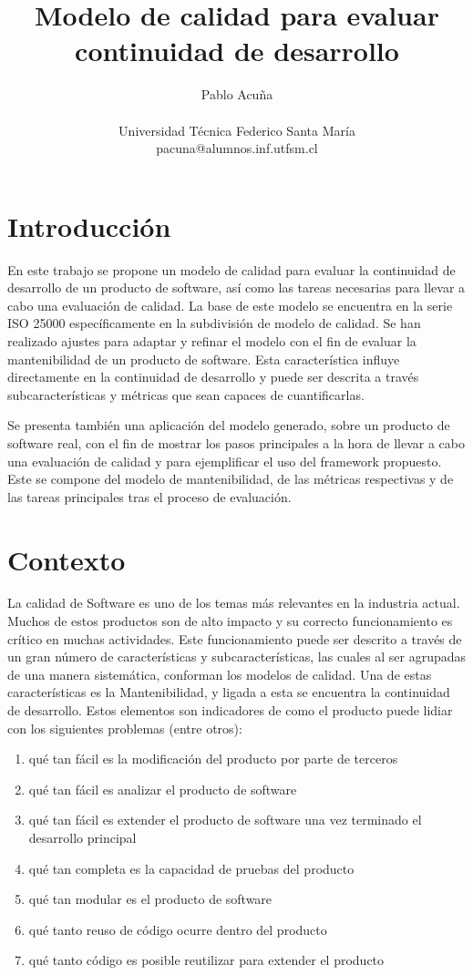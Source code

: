 \documentclass[letterpaper]{article}
\title{Modelo de calidad para evaluar continuidad de desarrollo}
\author{Pablo Acuña\\
\mbox{}\\
Universidad Técnica Federico Santa María \\
pacuna@alumnos.inf.utfsm.cl}
\begin{document}
\maketitle

\section{Introducción}

En este trabajo se propone un modelo de calidad para evaluar la continuidad
de desarrollo de un producto de software, así como las tareas necesarias
para llevar a cabo una evaluación de calidad.
La base de este modelo se encuentra en la serie ISO 25000
específicamente en la subdivisión de modelo de calidad.
Se han realizado ajustes para adaptar y refinar el modelo con el fin de evaluar la mantenibilidad de un producto de software.
Esta característica influye directamente en la continuidad de desarrollo y puede
ser descrita a través subcaracterísticas y métricas que sean capaces de cuantificarlas.

Se presenta también una aplicación del modelo generado, sobre un producto de software
real, con el fin de mostrar los pasos principales a la hora de llevar a cabo
una evaluación de calidad y para ejemplificar el uso del framework propuesto. Este se compone
del modelo de mantenibilidad, de las métricas respectivas y de las tareas principales tras el proceso de evaluación.

\section{Contexto}
La calidad de Software es uno de los temas más relevantes en la industria actual. Muchos de estos productos
son de alto impacto y su correcto funcionamiento es crítico en muchas actividades. Este funcionamiento
puede ser descrito a través de un gran número de características y subcaracterísticas, las cuales al ser agrupadas
de una manera sistemática, conforman los modelos de calidad. Una de estas características es la Mantenibilidad, y ligada
a esta se encuentra la continuidad de desarrollo. Estos elementos son indicadores de como el producto puede lidiar
con los siguientes problemas (entre otros):
\begin{enumerate}
	\item qué tan fácil es la modificación del producto por parte de terceros
	\item qué tan fácil es analizar el producto de software
	\item qué tan fácil es extender el producto de software una vez terminado el desarrollo principal
	\item qué tan completa es la capacidad de pruebas del producto
	\item qué tan modular es el producto de software
	\item qué tanto reuso de código ocurre dentro del producto
    \item qué tanto código es posible reutilizar para extender el producto
\end{enumerate}
\end{document}
